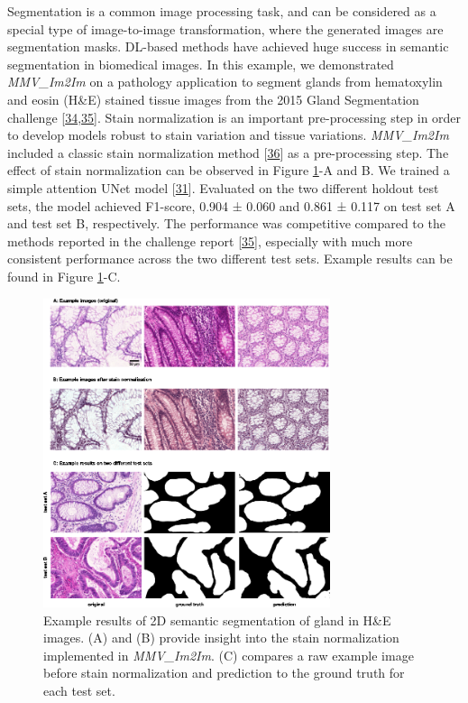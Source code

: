 Segmentation is a common image processing task, and can be considered as a special type of image-to-image transformation, where the generated images are segmentation masks. DL-based methods have achieved huge success in semantic segmentation in biomedical images. In this example, we demonstrated \emph{MMV\_Im2Im} on a pathology application to segment glands from hematoxylin and eosin (H\&E) stained tissue images from the 2015 Gland Segmentation challenge {[}\protect\hyperlink{ref-45Sirz1X}{34},\protect\hyperlink{ref-XAffSYIR}{35}{]}. Stain normalization is an important pre-processing step in order to develop models robust to stain variation and tissue variations. \emph{MMV\_Im2Im} included a classic stain normalization method {[}\protect\hyperlink{ref-tQhnZyjK}{36}{]} as a pre-processing step. The effect of stain normalization can be observed in Figure \ref{fig:2d_gland}-A and B. We trained a simple attention UNet model {[}\protect\hyperlink{ref-OCow1hly}{31}{]}. Evaluated on the two different holdout test sets, the model achieved F1-score, 0.904 ± 0.060 and 0.861 ± 0.117 on test set A and test set B, respectively. The performance was competitive compared to the methods reported in the challenge report {[}\protect\hyperlink{ref-XAffSYIR}{35}{]}, especially with much more consistent performance across the two different test sets. Example results can be found in Figure \ref{fig:2d_gland}-C.

\begin{figure}
\hypertarget{fig:2d_gland}{%
\centering
\includegraphics[width=0.75\textwidth,height=\textheight]{images/2d_semantic_seg_justin.png}
\caption{Example results of 2D semantic segmentation of gland in H\&E images. (A) and (B) provide insight into the stain normalization implemented in \emph{MMV\_Im2Im}. (C) compares a raw example image before stain normalization and prediction to the ground truth for each test set.}\label{fig:2d_gland}
}
\end{figure}

